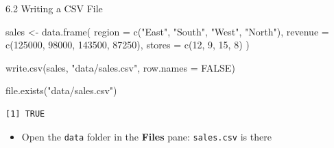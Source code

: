 \documentclass[
  ignorenonframetext,
  aspectratio=169,
]{beamer}
\newenvironment{Shaded}{\begin{snugshade}}{\end{snugshade}}
\newcommand{\AttributeTok}[1]{\textcolor[rgb]{0.40,0.45,0.13}{#1}}
\newcommand{\ConstantTok}[1]{\textcolor[rgb]{0.56,0.35,0.01}{#1}}
\newcommand{\DecValTok}[1]{\textcolor[rgb]{0.68,0.00,0.00}{#1}}
\newcommand{\FunctionTok}[1]{\textcolor[rgb]{0.28,0.35,0.67}{#1}}
\newcommand{\NormalTok}[1]{\textcolor[rgb]{0.00,0.23,0.31}{#1}}
\newcommand{\OtherTok}[1]{\textcolor[rgb]{0.00,0.23,0.31}{#1}}
\newcommand{\StringTok}[1]{\textcolor[rgb]{0.13,0.47,0.30}{#1}}
\providecommand{\tightlist}{%
  \setlength{\itemsep}{0pt}\setlength{\parskip}{0pt}}
\begin{document}
\begin{frame}[fragile]{6.2 Writing a CSV File}
\protect{}\label{writing-a-csv-file}
\begin{Shaded}
\begin{Highlighting}[]
\NormalTok{sales }\OtherTok{\textless{}{-}} \FunctionTok{data.frame}\NormalTok{(}
  \AttributeTok{region  =} \FunctionTok{c}\NormalTok{(}\StringTok{"East"}\NormalTok{, }\StringTok{"South"}\NormalTok{, }\StringTok{"West"}\NormalTok{, }\StringTok{"North"}\NormalTok{),}
  \AttributeTok{revenue =} \FunctionTok{c}\NormalTok{(}\DecValTok{125000}\NormalTok{, }\DecValTok{98000}\NormalTok{, }\DecValTok{143500}\NormalTok{, }\DecValTok{87250}\NormalTok{),}
  \AttributeTok{stores  =} \FunctionTok{c}\NormalTok{(}\DecValTok{12}\NormalTok{, }\DecValTok{9}\NormalTok{, }\DecValTok{15}\NormalTok{, }\DecValTok{8}\NormalTok{)}
\NormalTok{)}

\FunctionTok{write.csv}\NormalTok{(sales, }\StringTok{"data/sales.csv"}\NormalTok{, }\AttributeTok{row.names =} \ConstantTok{FALSE}\NormalTok{)}

\FunctionTok{file.exists}\NormalTok{(}\StringTok{"data/sales.csv"}\NormalTok{)}
\end{Highlighting}
\end{Shaded}

\begingroup\tiny\color{darkgray}

\begin{verbatim}
[1] TRUE
\end{verbatim}

\endgroup

\begin{itemize}
\tightlist
\item
  Open the \texttt{data} folder in the \textbf{Files} pane:
  \texttt{sales.csv} is there
\end{itemize}
\end{frame}
\end{document}
